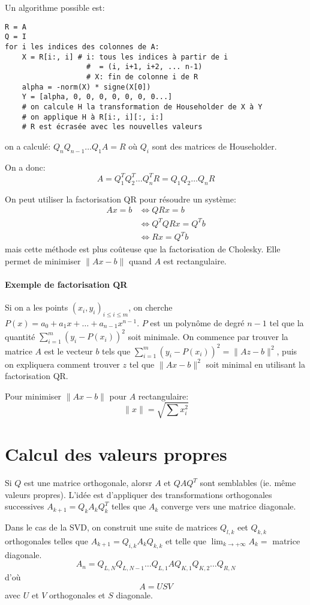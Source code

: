 \documentclass[a4paper,10pt,french,openany]{memoir}
\newcommand{\norm}[1]{\lVert#1\rVert}
\begin{document}
Un algorithme possible est:
\begin{lstlisting}
R = A
Q = I
for i les indices des colonnes de A:
    X = R[i:, i] # i: tous les indices à partir de i
                   #  = (i, i+1, i+2, ... n-1)
                   # X: fin de colonne i de R
    alpha = -norm(X) * signe(X[0])
    Y = [alpha, 0, 0, 0, 0, 0, 0, 0...]
    # on calcule H la transformation de Householder de X à Y
    # on applique H à R[i:, i][:, i:]
    # R est écrasée avec les nouvelles valeurs
\end{lstlisting}
on a calculé: $Q_n Q_{n-1} \dots Q_1 A = R$ où $Q_i$ sont des matrices de Householder.

On a donc: \[ A = Q_1^T Q_2^T \dots Q_n^T R = Q_1 Q_2 \dots Q_n R \]

On peut utiliser la factorisation QR pour résoudre un système:
\begin{align*}
 A x = b &\Leftrightarrow Q R x = b\\
    &\Leftrightarrow Q^T Q R x = Q^T b\\
    &\Leftrightarrow R x = Q^T b
\end{align*}
mais cette méthode est plus coûteuse que la factorisation de Cholesky. Elle permet de minimiser $\norm{A x - b}$ quand $A$ est rectangulaire.

\paragraph{Exemple de factorisation QR}
Si on a les points $(x_i, y_i)_{i \leq i \leq m}$, on cherche $P(x) = a_0 + a_1 x + \dots + a_{n-1} x^{n-1}$. $P$ est un polynôme de degré $n-1$ tel que la quantité $\sum_{i=1}^m (y_i - P(x_i))^2$ soit minimale. On commence par trouver la matrice $A$ est le vecteur $b$ tels que $\sum_{i=1}^m (y_i - P(x_i))^2 = \norm{A z - b}^2$, puis on expliquera comment trouver $z$ tel que $\norm{A x - b}^2$ soit minimal en utilisant la factorisation QR.

Pour minimiser $\norm{A x - b}$ pour $A$ rectangulaire: \[ \norm x = \sqrt{\sum x_i^2} \]

\section{Calcul des valeurs propres}

Si $Q$ est une matrice orthogonale, alorsr $A$ et $Q A Q^T$ sont semblables (ie. même valeurs propres). L'idée est d'appliquer des transformations orthogonales successives $A_{k+1} = Q_k A_k Q_k^T$ telles que $A_k$ converge vers une matrice diagonale.

Dans le cas de la SVD, on construit une suite de matrices $Q_{l, k}$ eet $Q_{k, k}$ orthogonales telles que $A_{k+1} = Q_{i, k} A_k Q_{k, k}$ et telle que $\lim_{k \to +\infty} A_k =$ matrice diagonale.
\[A_n = Q_{L, N} Q_{L, N-1} \dots Q_{L, 1} A Q_{K, 1} Q_{K, 2} \dots Q_{R, N}\] d'où \[A = USV\] avec $U$ et $V$ orthogonales et $S$ diagonale.
\end{document}
